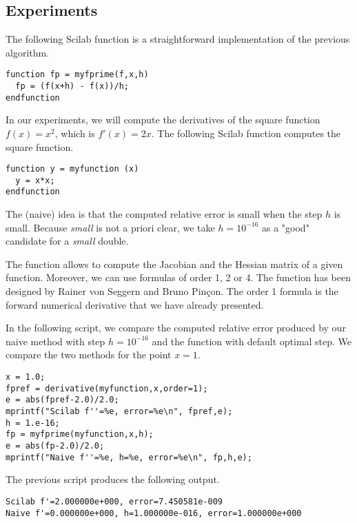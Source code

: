 \subsection{Experiments}

The following Scilab function  is a straightforward implementation
of the previous algorithm.
\lstset{language=scilabscript}
\begin{lstlisting}
function fp = myfprime(f,x,h)
  fp = (f(x+h) - f(x))/h;
endfunction
\end{lstlisting}

In our experiments, we will compute the derivatives of the 
square function $f(x)=x^2$, which is $f'(x)=2x$.
The following Scilab function  computes the square function.
\lstset{language=scilabscript}
\begin{lstlisting}
function y = myfunction (x)
  y = x*x;
endfunction
\end{lstlisting}

The (naive) idea is that the computed relative error 
is small when the step $h$ is small. Because \emph{small}
is not a priori clear, we take $h= 10^{-16}$
as a "good" candidate for a \emph{small} double.

The  function allows to compute the Jacobian and 
the Hessian matrix of a given function.
Moreover, we can use formulas of order 1, 2 or 4. 
The  function has been designed by Rainer von Seggern 
and Bruno Pin{\c c}on. The order 1 formula is the forward numerical 
derivative that we have already presented.

In the following script, we compare the computed 
relative error produced by our naive method with step
$h=10^{-16}$ and the  function with
default optimal step. We compare the two methods for the point $x=1$.
\lstset{language=scilabscript}
\begin{lstlisting}
x = 1.0;
fpref = derivative(myfunction,x,order=1);
e = abs(fpref-2.0)/2.0;
mprintf("Scilab f''=%e, error=%e\n", fpref,e);
h = 1.e-16;
fp = myfprime(myfunction,x,h);
e = abs(fp-2.0)/2.0;
mprintf("Naive f''=%e, h=%e, error=%e\n", fp,h,e);
\end{lstlisting}

The previous script produces the following output.
\begin{lstlisting}
Scilab f'=2.000000e+000, error=7.450581e-009
Naive f'=0.000000e+000, h=1.000000e-016, error=1.000000e+000
\end{lstlisting}

